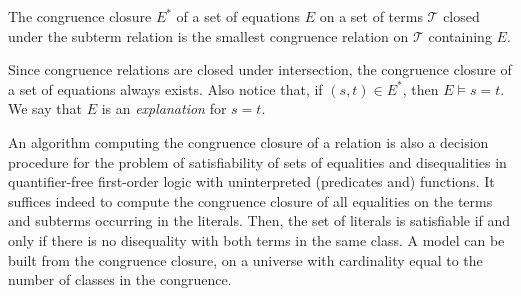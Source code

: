\documentclass[smallextended]{svjour3}
\begin{document}
\begin{definition}
The congruence closure $E^*$ of a set of equations $E$ on a set of terms $\mathcal{T}$ closed under the subterm relation is the smallest congruence relation on $\mathcal{T}$ containing $E$.

\end{definition}
\noindent
Since congruence relations are closed under intersection, the congruence closure of a set of equations always exists.  Also notice that, if  $(s,t) \in E^*$, then $E \models s = t$.  We say that $E$ is an \emph{explanation} for $s = t$.

An algorithm computing the congruence closure of a relation is also a decision procedure for the problem of satisfiability of sets of equalities
and disequalities in quantifier-free first-order logic with uninterpreted
(predicates and) functions.  It suffices indeed to compute the congruence
closure of all equalities on the terms and subterms occurring in the
literals.
Then, the set of literals is satisfiable if and only if there is no disequality with both terms in the same class.  A model can be built from the congruence closure, on a universe with cardinality equal to the number of classes in the congruence.

%
%
%
%
%
\end{document}
